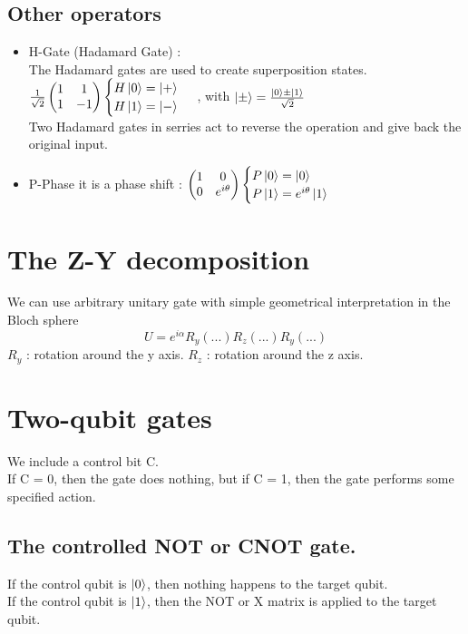 \documentclass[12pt,oneside]{book}
\begin{document}
\subsection{Other operators}
    \begin{itemize}
        \item H-Gate (Hadamard Gate) :\\
        The Hadamard gates are used to create superposition states.\\
        $\frac{1}{\sqrt{2}} \left( \begin{matrix}
            1&1  \\ 
            1&-1 \\ 
           \end{matrix}\right) \begin{cases}
            H\ket{0} = \ket{+} \\
            H\ket{1} = \ket{-}
           \end{cases}$ , with $\ket{\pm} = \frac{\ket{0}\pm\ket{1}}{\sqrt{2}}$\\
           Two Hadamard gates in serries act to reverse the operation and give back the original input.
        \item P-Phase it is a phase shift : $\left( \begin{matrix}
            1&0  \\ 
            0&e^{i\theta} \\ 
           \end{matrix}\right) \begin{cases}
            P\ket{0} = \ket{0} \\
            P\ket{1} = e^{i\theta}\ket{1}
           \end{cases}$
    \end{itemize}
\section{The Z-Y decomposition}
We can use arbitrary unitary gate with simple geometrical interpretation in the Bloch sphere
\[ U = e^{i\alpha} R_y(...)R_z(...)R_y(...) \]
$R_y$ : rotation around the y axis.
$R_z$ : rotation around the z axis.
\section{Two-qubit gates}
We include a control bit C.\\
If C = 0, then the gate does nothing, but if C = 1, then the gate performs some specified action.
\subsection{The controlled NOT or CNOT gate.}
If the control qubit is $\ket{0}$, then nothing happens to the target qubit.\\
If the control qubit is $\ket{1}$, then the NOT or X matrix is applied to the target qubit.\\
\end{document}
